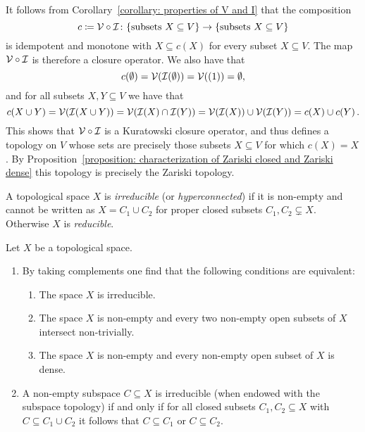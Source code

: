 \begin{remark}
  It follows from Corollary~\ref{corollary: properties of V and I} that the composition
  \[
              c
    \coloneqq  \mathcal{V} \circ \mathcal{I}
    \colon    \{ \text{subsets $X \subseteq V$} \}
    \to       \{ \text{subsets $X \subseteq V$} \}
  \]
  is idempotent and monotone with $X \subseteq c(X)$ for every subset $X \subseteq V$.
  The map $\mathcal{V} \circ \mathcal{I}$ is therefore a closure operator.
  We also have that
  \[
      c(\emptyset)
    = \mathcal{V}(\mathcal{I}(\emptyset))
    = \mathcal{V}((1))
    = \emptyset,
  \]
  and for all subsets $X, Y \subseteq V$ we have that
  \[
      c(X \cup Y)
    = \mathcal{V}(\mathcal{I}(X \cup Y))
    = \mathcal{V}(\mathcal{I}(X) \cap \mathcal{I}(Y))
    = \mathcal{V}(\mathcal{I}(X)) \cup \mathcal{V}(\mathcal{I}(Y))
    = c(X) \cup c(Y) \,.
  \]
  This shows that $\mathcal{V} \circ \mathcal{I}$ is a Kuratowski closure operator, and thus defines a topology on $V$ whose sets are precisely those subsets $X \subseteq V$ for which $c(X) = X$.
  By Proposition~\ref{proposition: characterization of Zariski closed and Zariski dense} this topology is precisely the Zariski topology.
\end{remark}


\begin{definition}
  A topological space $X$ is \emph{irreducible} (or \emph{hyperconnected}) if it is non-empty and cannot be written as $X = C_1 \cup C_2$ for proper closed subsets $C_1, C_2 \subsetneq X$.
  Otherwise $X$ is \emph{reducible}.
\end{definition}


\begin{remark}
  Let $X$ be a topological space.
  \begin{enumerate}
    \item
      By taking complements one find that the following conditions are equivalent:
      \begin{enumerate}
        \item
          The space $X$ is irreducible.
        \item
          The space $X$ is non-empty and every two non-empty open subsets of $X$ intersect non-trivially.
        \item
          The space $X$ is non-empty and every non-empty open subset of $X$ is dense.
      \end{enumerate}
    \item
      A non-empty subspace $C \subseteq X$ is irreducible (when endowed with the subspace topology) if and only if for all closed subsets $C_1, C_2 \subseteq X$ with $C \subseteq C_1 \cup C_2$ it follows that $C \subseteq C_1$ or $C \subseteq C_2$.
  \end{enumerate}
\end{remark}


